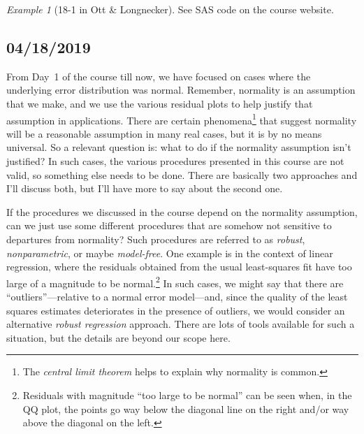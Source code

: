 \documentclass[a4paper, 12pt]{article}
\theoremstyle{plain}
\theoremstyle{definition}
\theoremstyle{remark}
\newtheorem*{example}{Example}
\begin{document}
\begin{example}[18-1 in Ott \& Longnecker]
See SAS code on the course website.
\end{example}



\subsection*{04/18/2019}

From Day~1 of the course till now, we have focused on cases where the underlying error distribution was normal.  Remember, normality is an assumption that we make, and we use the various residual plots to help justify that assumption in applications.  There are certain phenomena\footnote{The {\em central limit theorem} helps to explain why normality is common.} that suggest normality will be a reasonable assumption in many real cases, but it is by no means universal.  So a relevant question is: what to do if the normality assumption isn't justified?  In such cases, the various procedures presented in this course are not valid, so something else needs to be done.  There are basically two approaches and I'll discuss both, but I'll have more to say about the second one.  

If the procedures we discussed in the course depend on the normality assumption, can we just use some different procedures that are somehow not sensitive to departures from normality?  Such procedures are referred to as {\em robust}, {\em nonparametric}, or maybe {\em model-free}.  One example is in the context of linear regression, where the residuals obtained from the usual least-squares fit have too large of a magnitude to be normal.\footnote{Residuals with magnitude ``too large to be normal'' can be seen when, in the QQ plot, the points go way below the diagonal line on the right and/or way above the diagonal on the left.}  In such cases, we might say that there are ``outliers''---relative to a normal error model---and, since the quality of the least squares estimates deteriorates in the presence of outliers, we would consider an alternative {\em robust regression} approach.  There are lots of tools available for such a situation, but the details are beyond our scope here.  
\end{document}
